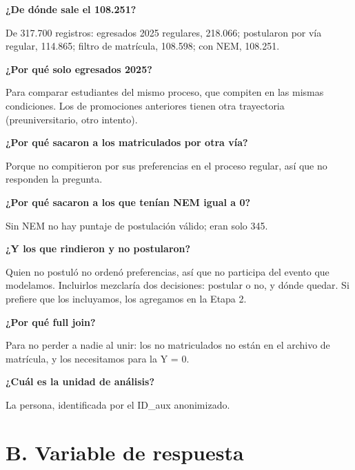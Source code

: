 \documentclass[11pt]{article}
\begin{document}
\textbf{¿De dónde sale el 108.251?}\par
\begin{guion}De 317.700 registros: egresados 2025 regulares, 218.066; postularon por vía regular, 114.865; filtro de matrícula, 108.598; con NEM, 108.251.\end{guion}

\textbf{¿Por qué solo egresados 2025?}\par
\begin{guion}Para comparar estudiantes del mismo proceso, que compiten en las mismas condiciones. Los de promociones anteriores tienen otra trayectoria (preuniversitario, otro intento).\end{guion}

\textbf{¿Por qué sacaron a los matriculados por otra vía?}\par
\begin{guion}Porque no compitieron por sus preferencias en el proceso regular, así que no responden la pregunta.\end{guion}

\textbf{¿Por qué sacaron a los que tenían NEM igual a 0?}\par
\begin{guion}Sin NEM no hay puntaje de postulación válido; eran solo 345.\end{guion}

\textbf{¿Y los que rindieron y no postularon?}\par
\begin{guion}Quien no postuló no ordenó preferencias, así que no participa del evento que modelamos. Incluirlos mezclaría dos decisiones: postular o no, y dónde quedar. Si prefiere que los incluyamos, los agregamos en la Etapa 2.\end{guion}

\textbf{¿Por qué full join?}\par
\begin{guion}Para no perder a nadie al unir: los no matriculados no están en el archivo de matrícula, y los necesitamos para la Y = 0.\end{guion}

\textbf{¿Cuál es la unidad de análisis?}\par
\begin{guion}La persona, identificada por el ID\_aux anonimizado.\end{guion}

\section*{B. Variable de respuesta}
\end{document}
